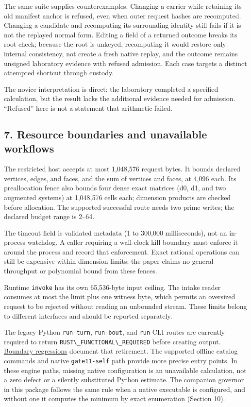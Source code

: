 \documentclass[
  11pt,
]{article}
\newcommand{\passthrough}[1]{#1}
\begin{document}
The same suite supplies counterexamples. Changing a carrier while
retaining its old manifest anchor is refused, even when outer request
hashes are recomputed. Changing a candidate and recomputing its
surrounding identity still fails if it is not the replayed normal form.
Editing a field of a returned outcome breaks its root check; because the
root is unkeyed, recomputing it would restore only internal consistency,
not create a fresh native replay, and the outcome remains unsigned
laboratory evidence with refused admission. Each case targets a distinct
attempted shortcut through custody.

The novice interpretation is direct: the laboratory completed a
specified calculation, but the result lacks the additional evidence
needed for admission. ``Refused'' here is not a statement that
arithmetic failed.

\subsection{7. Resource boundaries and unavailable
workflows}\label{resource-boundaries-and-unavailable-workflows}

The restricted host accepts at most 1,048,576 request bytes. It bounds
declared vertices, edges, and faces, and the sum of vertices and faces,
at 4,096 each. Its preallocation fence also bounds four dense exact
matrices (d0, d1, and two augmented systems) at 1,048,576 cells each;
dimension products are checked before allocation. The supported
successful route needs two prime writes; the declared budget range is
2--64.

The timeout field is validated metadata (1 to 300,000 milliseconds), not
an in-process watchdog. A caller requiring a wall-clock kill boundary
must enforce it around the process and record that enforcement. Exact
rational operations can still be expensive within dimension limits; the
paper claims no general throughput or polynomial bound from these
fences.

Runtime \passthrough{\lstinline!invoke!} has its own 65,536-byte input
ceiling. The intake reader consumes at most the limit plus one witness
byte, which permits an oversized request to be rejected without reading
an unbounded stream. These limits belong to different interfaces and
should be reported separately.

The legacy Python \passthrough{\lstinline!run-turn!},
\passthrough{\lstinline!run-bout!}, and \passthrough{\lstinline!run!}
CLI routes are currently required to return
\passthrough{\lstinline!RUST\_FUNCTIONAL\_REQUIRED!} before creating
output.
\href{https://github.com/dbccpage/the_symbol_game/blob/52cb5457f6c485ba548cfd292f6012a941ed22cf/symbol_game/tests/test_functional_boundary.py}{Boundary
regressions} document that retirement. The supported offline catalog
commands and native \passthrough{\lstinline!gate11-self!} path provide
more precise entry points. In these engine paths, missing native
configuration is an unavailable calculation, not a zero defect or a
silently substituted Python estimate. The companion governor in this
package follows the same rule when a native executable is configured,
and without one it computes the minimum by exact enumeration (Section
10).
\end{document}
